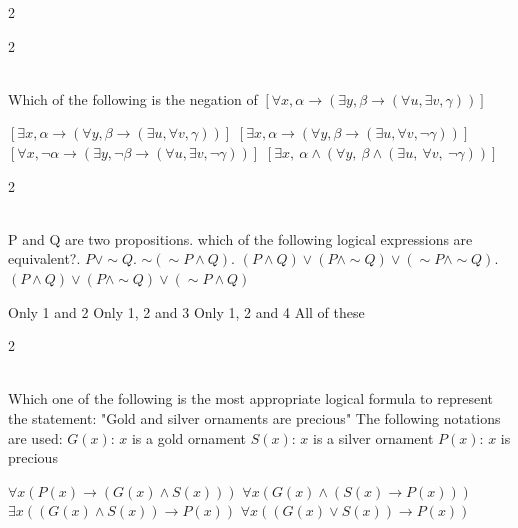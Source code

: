 \documentclass[12pt]{exam}
\begin{document}
\begin{questions}
\begin{multicols*}{2}
\end{multicols*}
\vspace{0.6cm}
\newpage
\begin{multicols*}{2}

 \\[0.2cm]
{\Large Which of the following is the negation of $[\forall x, \alpha \rightarrow (\exists y, \beta \rightarrow (\forall u, \exists v, \gamma))]$}
\begin{choices}
  \choice $[\exists x, \alpha \rightarrow (\forall y, \beta \rightarrow (\exists u, \forall v, \gamma))]$
  \choice $[\exists x, \alpha \rightarrow (\forall y, \beta \rightarrow (\exists u, \forall v, \neg \gamma))]$
  \choice $[\forall x, \neg \alpha \rightarrow (\exists y, \neg \beta \rightarrow (\forall u, \exists v, \neg \gamma))]$
  \choice $\left[ \exists x,\ \alpha \land \left( \forall y,\ \beta \land \left( \exists u,\ \forall v,\ \neg \gamma \right) \right) \right]$
\end{choices}

\end{multicols*}
\vspace{0.6cm}
\newpage
\begin{multicols*}{2}

 \\[0.2cm]
{\Large P and Q are two propositions. which of the following logical expressions are equivalent?. $P \vee \sim Q$. $\sim (\sim P \wedge Q)$. $(P \wedge Q) \vee (P \wedge \sim Q) \vee (\sim P \wedge \sim Q)$. $(P \wedge Q) \vee (P \wedge \sim Q) \vee (\sim P \wedge Q)$}
\begin{choices}
  \choice Only 1 and 2
  \choice Only 1, 2 and 3
  \choice Only 1, 2 and 4
  \choice All of these
\end{choices}

\end{multicols*}
\vspace{0.6cm}
\newpage
\begin{multicols*}{2}

 \\[0.2cm]
{\Large Which one of the following is the most appropriate logical formula to represent the statement: "Gold and silver ornaments are precious"\newline
The following notations are used:\newline
$G(x)$: $x$ is a gold ornament\newline
$S(x)$: $x$ is a silver ornament\newline
$P(x)$: $x$ is precious}
\begin{choices}
  \choice $\forall x(P(x) \rightarrow (G(x) \wedge S(x)))$
  \choice $\forall x(G(x) \wedge (S(x) \rightarrow P(x)))$
  \choice $\exists x((G(x) \wedge S(x)) \rightarrow P(x))$
  \choice $\forall x((G(x) \vee S(x)) \rightarrow P(x))$
\end{choices}


\end{multicols*}
\end{questions}
\end{document}
